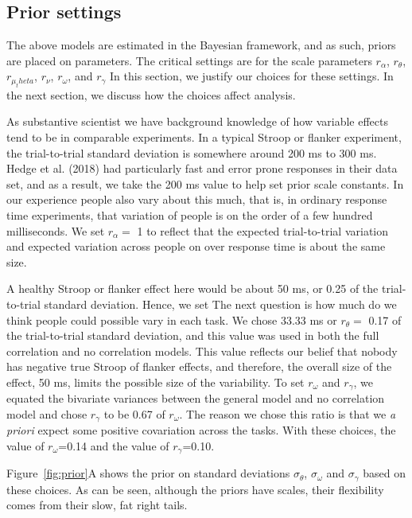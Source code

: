 \documentclass[english,man]{apa6}
\theoremstyle{definition}
\theoremstyle{definition}
\theoremstyle{definition}
\theoremstyle{remark}
\begin{document}
\subsection{Prior settings}\label{prior-settings}

The above models are estimated in the Bayesian framework, and as such,
priors are placed on parameters. The critical settings are for the scale
parameters \(r_\alpha\), \(r_\theta\), \(r_{\mu_theta}\), \(r_\nu\),
\(r_\omega\), and \(r_\gamma\) In this section, we justify our choices
for these settings. In the next section, we discuss how the choices
affect analysis.

As substantive scientist we have background knowledge of how variable
effects tend to be in comparable experiments. In a typical Stroop or
flanker experiment, the trial-to-trial standard deviation is somewhere
around 200 ms to 300 ms. Hedge et al. (2018) had particularly fast and
error prone responses in their data set, and as a result, we take the
200 ms value to help set prior scale constants. In our experience people
also vary about this much, that is, in ordinary response time
experiments, that variation of people is on the order of a few hundred
milliseconds. We set \(r_\alpha=\) 1 to reflect that the expected
trial-to-trial variation and expected variation across people on over
response time is about the same size.

A healthy Stroop or flanker effect here would be about 50 ms, or 0.25 of
the trial-to-trial standard deviation. Hence, we set The next question
is how much do we think people could possible vary in each task. We
chose 33.33 ms or \(r_\theta=\) 0.17 of the trial-to-trial standard
deviation, and this value was used in both the full correlation and no
correlation models. This value reflects our belief that nobody has
negative true Stroop of flanker effects, and therefore, the overall size
of the effect, 50 ms, limits the possible size of the variability. To
set \(r_\omega\) and \(r_\gamma\), we equated the bivariate variances
between the general model and no correlation model and chose
\(r_\gamma\) to be 0.67 of \(r_\omega\). The reason we chose this ratio
is that we \emph{a priori} expect some positive covariation across the
tasks. With these choices, the value of \(r_\omega\)=0.14 and the value
of \(r_\gamma\)=0.10.

Figure~\ref{fig:prior}A shows the prior on standard deviations
\(\sigma_\theta\), \(\sigma_\omega\) and \(\sigma_\gamma\) based on
these choices. As can be seen, although the priors have scales, their
flexibility comes from their slow, fat right tails.
\end{document}
